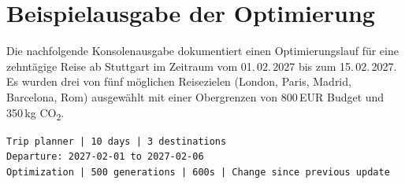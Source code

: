 \section{Beispielausgabe der Optimierung}
\label{app:beispielausgabe}

Die nachfolgende Konsolenausgabe dokumentiert einen Optimierungslauf für eine zehntägige Reise ab Stuttgart im Zeitraum vom 01.\,02.\,2027 bis zum 15.\,02.\,2027. Es wurden drei von fünf möglichen Reisezielen (London, Paris, Madrid, Barcelona, Rom) ausgewählt mit einer Obergrenzen von 800\,EUR Budget und 350\,kg CO\textsubscript{2}. 

\begin{tcolorbox}[
  breakable,
  enhanced,
  colback=termbg,
  colframe=termborder,
  colupper=termfg,
  before upper=\singlespacing,
  arc=5pt,
  boxrule=0.8pt,
  left=6pt, right=6pt, top=1pt, bottom=6pt
]
\begin{lstlisting}[style=terminalstyle]
Trip planner | 10 days | 3 destinations
Departure: 2027-02-01 to 2027-02-06
Optimization | 500 generations | 600s | Change since previous update


\end{lstlisting}
\end{tcolorbox}
